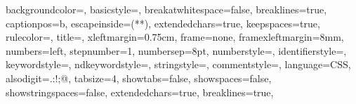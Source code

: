  {
  backgroundcolor=\color{editorGray},   		%
  basicstyle=\footnotesize\ttfamily,	%
  breakatwhitespace=false,         				%
  breaklines=true,                 				%
  captionpos=b,                    				%
  escapeinside={(*}{*)},          			%
  extendedchars=true,             		 	%
  keepspaces=true,                			%
  rulecolor=\color{black},       		%
  title=\lstname,                  		 		%
  xleftmargin={0.75cm},
  frame=none,%
  framexleftmargin=8mm,							%
  numbers=left,                    			%
  stepnumber=1,                    			%
  numbersep=8pt,                   			%
  numberstyle=\footnotesize\ttfamily,		 %
  identifierstyle=\color{black},
  keywordstyle=\color{htmltags},
  ndkeywordstyle=\color{htmlattributes},
  stringstyle=\color{htmlstrings},
  commentstyle=\color{htmlcomments},
  language=CSS,
  alsodigit={.:!;@},	
  tabsize=4,                   					%
  showtabs=false,                  			%
  showspaces=false,                			%
  showstringspaces=false,          			%
  extendedchars=true,
  breaklines=true,  
}

